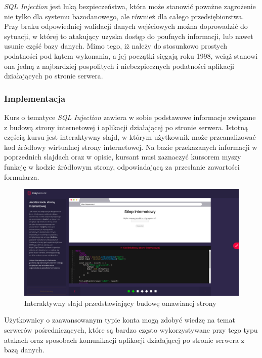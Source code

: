 \documentclass[12pt,twoside]{article}
\begin{document}
\emph{SQL Injection} jest luką bezpieczeństwa, która może stanowić poważne zagrożenie nie tylko dla systemu bazodanowego, ale również dla całego przedsiębiorstwa. Przy braku odpowiedniej walidacji danych wejściowych można doprowadzić do sytuacji, w której to atakujący uzyska dostęp do poufnych informacji, lub nawet usunie część bazy danych. Mimo tego, iż należy do stosunkowo prostych podatności pod kątem wykonania, a jej początki sięgają roku 1998, wciąż stanowi ona jedną z najbardziej pospolitych i niebezpiecznych podatności aplikacji działających po stronie serwera.

\subsubsection{Implementacja}

Kurs o tematyce \emph{SQL Injection} zawiera w sobie podstawowe informacje związane z budową strony internetowej i aplikacji działającej po stronie serwera. Istotną częścią kursu jest interaktywny slajd, w którym użytkownik może przeanalizować kod źródłowy wirtualnej strony internetowej. Na bazie przekazanych informacji w poprzednich slajdach oraz w opisie, kursant musi zaznaczyć kursorem myszy funkcję w kodzie źródłowym strony, odpowiadającą za przesłanie zawartości formularza.

\begin{figure}[H]
	\centering
	\includegraphics[width=1\linewidth]{figures/sql-slide-screenshot1.png}
	\caption{Interaktywny slajd przedstawiający budowę omawianej strony}
	\label{Fig:Interaktywny slajd przedstawiający budowę omawianej strony}
\end{figure} 

Użytkownicy o zaawansowanym typie konta mogą zdobyć wiedzę na temat serwerów pośredniczących, które są bardzo często wykorzystywane przy tego typu atakach oraz sposobach komunikacji aplikacji działającej po stronie serwera z bazą danych. 
\end{document}
